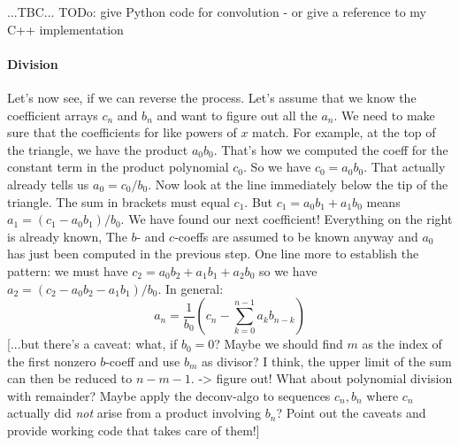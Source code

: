...TBC... TODo: give Python code for convolution - or give a reference to my C++ implementation

\paragraph{Division}
Let's now see, if we can reverse the process. Let's assume that we know the coefficient arrays $c_n$ and $b_n$ and want to figure out all the $a_n$. We need to make sure that the coefficients for like powers of $x$ match. For example, at the top of the triangle, we have the product $a_0 b_0$. That's how we computed the coeff for the constant term in the product polynomial $c_0$. So we have $c_0 = a_0 b_0$. That actually already tells us $a_0 = c_0 / b_0$. Now look at the line immediately below the tip of the triangle. The sum in brackets must equal $c_1$. But $c_1 = a_0 b_1 + a_1 b_0$ means $a_1 = (c_1 -a_0 b_1)/b_0$. We have found our next coefficient! Everything on the right is already known, The $b$- and $c$-coeffs are assumed to be known anyway and $a_0$ has just been computed in the previous step. One line more to establish the pattern: we must have $c_2 = a_0 b_2 + a_1 b_1 + a_2 b_0$ so we have $a_2 = (c_2 - a_0 b_2 - a_1 b_1)/b_0$. In general:
\begin{equation}
a_n = \frac{1}{b_0} (  c_n - \sum_{k=0}^{n-1} a_k b_{n-k} ) 
\end{equation}
[...but there's a caveat: what, if $b_0 = 0$? Maybe we should find $m$ as the index of the first nonzero $b$-coeff and use $b_m$ as divisor? I think, the upper limit of the sum can then be reduced to $n-m-1$. -> figure out! What about polynomial division with remainder? Maybe apply the deconv-algo to sequences $c_n, b_n$ where $c_n$ actually did \emph{not} arise from a product involving $b_n$? Point out the caveats and provide working code that takes care of them!]




